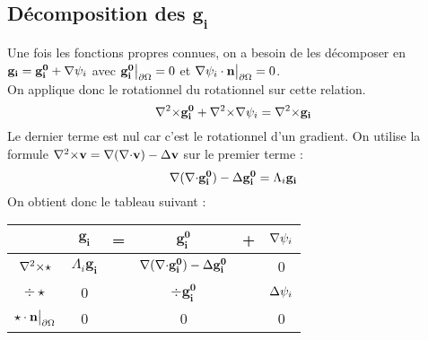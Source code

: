 \subsection{Décomposition des $\mathbf{g_i}$}
\label{decomp}

Une fois les fonctions propres connues, on a besoin de les décomposer en $\mathbf{g_i}=\mathbf{g_i^0}+{\nabla}\psi_i$ avec $\mathbf{g_i^0}{\big\rvert_{\partial\Omega}} = 0$ et ${\nabla}\psi_i\cdot \mathbf{n}{\big\rvert_{\partial\Omega}} = 0$.\\
On applique donc le rotationnel du rotationnel sur cette relation.\\
\[ {\nabla^2\times} \mathbf{g_i^0} +{\nabla^2\times}{\nabla}\psi_i = {\nabla^2\times} \mathbf{g_i} \]
Le dernier terme est nul car c'est le rotationnel d'un gradient. On utilise la formule ${\nabla^2\times} \mathbf{v}={\nabla}({\nabla\cdot} \mathbf{v})-{\Delta} \mathbf{v}$ sur le premier terme :
\[ {\nabla}({\nabla\cdot} \mathbf{g_i^0})-{\Delta} \mathbf{g_i^0} = \Lambda_i \mathbf{g_i} \]
On obtient donc le tableau suivant :
\begin{center}
\begin{tabular}{c|ccccc}
& $\mathbf{g_i}$ & = & $\mathbf{g_i^0}$ & + & ${\nabla}\psi_i$ \\ \hline
${\nabla^2\times}\star$ & $\Lambda_i\mathbf{g_i}$ & & ${\nabla}({\nabla\cdot} \mathbf{g_i^0})-{\Delta} \mathbf{g_i^0}$ & & 0\\ \hline
$\div\star$ & 0 & & $\div \mathbf{g_i^0}$ & & ${\Delta}\psi_i$\\ \hline
$\star\cdot \mathbf{n}{\big\rvert_{\partial\Omega}}$ & 0 & & 0 & & 0
\end{tabular}
\end{center}

